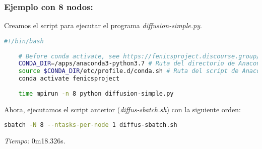 \subsubsection*{Ejemplo con 8 nodos:}
Creamos el script para ejecutar el programa \textit{diffusion-simple.py}.
\begin{lstlisting}[language=sh]
	#!/bin/bash
	
	# Before conda activate, see https://fenicsproject.discourse.group/t/fenics-from-conda-doesnt-import/3502/6
	CONDA_DIR=/apps/anaconda3-python3.7 # Ruta del directorio de Anaconda
	source $CONDA_DIR/etc/profile.d/conda.sh # Ruta del script de Anaconda
	conda activate fenicsproject
	
	time mpirun -n 8 python diffusion-simple.py
\end{lstlisting}

Ahora, ejecutamos el script anterior (\textit{diffus-sbatch.sh}) con la siguiente orden:
\begin{lstlisting}[language=sh]
	sbatch -N 8 --ntasks-per-node 1 diffus-sbatch.sh
\end{lstlisting}

\textit{Tiempo:} 0m18.326s.

